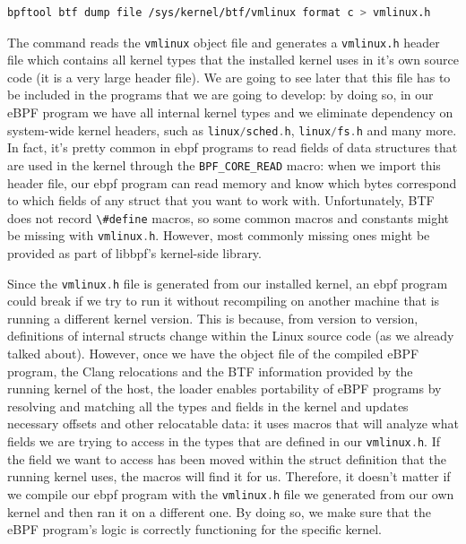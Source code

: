 \begin{lstlisting}[style=commandline, language=bash, caption={vmlinux.h generation command}]
	bpftool btf dump file /sys/kernel/btf/vmlinux format c > vmlinux.h
\end{lstlisting}

The command reads the \colorbox{backcolour}{\lstinline[style=highlight, language=bash]|vmlinux|} object file and generates a \colorbox{backcolour}{\lstinline[style=highlight, language=bash]|vmlinux.h|} header file which contains all kernel types that the installed kernel uses in it’s own source code (it is a very large header file). 
We are going to see later that this file has to be included in the programs that we are going to develop: by doing so, in our eBPF program we have all internal kernel types and we eliminate dependency on system-wide kernel headers, such as \colorbox{backcolour}{\lstinline[style=cstyle, language=C]|linux/sched.h|}, \colorbox{backcolour}{\lstinline[style=cstyle, language=C]|linux/fs.h|} and many more.
In fact, it’s pretty common in ebpf programs to read fields of data structures that are used in the kernel through the \colorbox{backcolour}{\lstinline[style=cstyle, language=C]|BPF_CORE_READ|} macro: when we import this header file, our ebpf program can read memory and know which bytes correspond to which fields of any struct that you want to work with.
Unfortunately, BTF does not record \colorbox{backcolour}{\lstinline[style=cstyle, language=C]|\#define|} macros, so some common macros and constants might be missing with \colorbox{backcolour}{\lstinline[style=cstyle, language=C]|vmlinux.h|}. 
However, most commonly missing ones might be provided as part of libbpf’s kernel-side library.

Since the \colorbox{backcolour}{\lstinline[style=cstyle, language=C]|vmlinux.h|} file is generated from our installed kernel, an ebpf program could break if we try to run it without recompiling on another machine that is running a different kernel version. 
This is because, from version to version, definitions of internal structs change within the Linux source code (as we already talked about).
However, once we have the object file of the compiled eBPF program, the Clang relocations and the BTF information provided by the running kernel of the host, the loader enables portability of eBPF programs by resolving and matching all the types and fields in the kernel and updates necessary offsets and other relocatable data: it uses macros that will analyze what fields we are trying to access in the types that are defined in our \colorbox{backcolour}{\lstinline[style=cstyle, language=C]|vmlinux.h|}. 
If the field we want to access has been moved within the struct definition that the running kernel uses, the macros will find it for us. 
Therefore, it doesn't matter if we compile our ebpf program with the \colorbox{backcolour}{\lstinline[style=cstyle, language=C]|vmlinux.h|} file we generated from our own kernel and then ran it on a different one.
By doing so, we make sure that the eBPF program’s logic is correctly functioning for the specific kernel.

